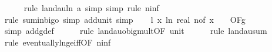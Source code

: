 \begin{isabellebody}
\ \ \ \ \isamarkupfalse%
\ {\isacharparenleft}{\kern0pt}rule\ landau{\isacharunderscore}{\kern0pt}ln{\isacharunderscore}{\kern0pt}{}{\isacharbrackleft}{\kern0pt}\ a{\isacharequal}{\kern0pt}{\isachardoublequoteopen}{}{\isachardoublequoteclose}{\isacharbrackright}{\kern0pt}{\isacharcomma}{\kern0pt}\ simp{\isacharcomma}{\kern0pt}\ simp{\isacharcomma}{\kern0pt}\ rule\ n{\isacharunderscore}{\kern0pt}inf{\isacharparenright}{\kern0pt}\isanewline
\ \ \ \ \isamarkupfalse%
\ {\isacharparenleft}{\kern0pt}rule\ sum{\isacharunderscore}{\kern0pt}in{\isacharunderscore}{\kern0pt}bigo{\isacharcomma}{\kern0pt}\ simp\ add{\isacharcolon}{\kern0pt}unit{\isacharunderscore}{\kern0pt}{}{\isacharcomma}{\kern0pt}\ simp{\isacharparenright}{\kern0pt}\isanewline
\isanewline
\ \ \isamarkupfalse%
\ l{}{\isacharcolon}{\kern0pt}\ {\isachardoublequoteopen}{\isacharparenleft}{\kern0pt}{\isasymlambda}x{\isachardot}{\kern0pt}\ ln\ {\isacharparenleft}{\kern0pt}real\ {\isacharparenleft}{\kern0pt}n{\isacharunderscore}{\kern0pt}of\ x{\isacharparenright}{\kern0pt}\ {\isacharplus}{\kern0pt}\ {}{}{\isacharparenright}{\kern0pt}{\isacharparenright}{\kern0pt}\ {\isasymin}\ O{\isacharbrackleft}{\kern0pt}{\isacharquery}{\kern0pt}F{\isacharbrackright}{\kern0pt}{\isacharparenleft}{\kern0pt}g{\isacharparenright}{\kern0pt}{\isachardoublequoteclose}\isanewline
\ \ \ \ \isamarkupfalse%
\ {\isacharparenleft}{\kern0pt}simp\ add{\isacharcolon}{\kern0pt}g{\isacharunderscore}{\kern0pt}def{\isacharparenright}{\kern0pt}\isanewline
\ \ \ \ \isamarkupfalse%
\ {\isacharparenleft}{\kern0pt}rule\ landau{\isacharunderscore}{\kern0pt}o{\isachardot}{\kern0pt}big{\isacharunderscore}{\kern0pt}mult{\isacharunderscore}{\kern0pt}{}{\isacharprime}{\kern0pt}{\isacharbrackleft}{\kern0pt}OF\ unit{\isacharunderscore}{\kern0pt}{}{\isacharbrackright}{\kern0pt}{\isacharparenright}{\kern0pt}\isanewline
\ \ \ \ \isamarkupfalse%
\ {\isacharparenleft}{\kern0pt}rule\ landau{\isacharunderscore}{\kern0pt}sum{\isacharunderscore}{\kern0pt}{}{\isacharparenright}{\kern0pt}\isanewline
\ \ \ \ \ \ \isamarkupfalse%
\ {\isacharparenleft}{\kern0pt}rule\ eventually{\isacharunderscore}{\kern0pt}ln{\isacharunderscore}{\kern0pt}ge{\isacharunderscore}{\kern0pt}iff{\isacharbrackleft}{\kern0pt}OF\ n{\isacharunderscore}{\kern0pt}inf{\isacharbrackright}{\kern0pt}{\isacharparenright}{\kern0pt}\isanewline
\ \ \ \ \ \isamarkupfalse%

\end{isabellebody}
